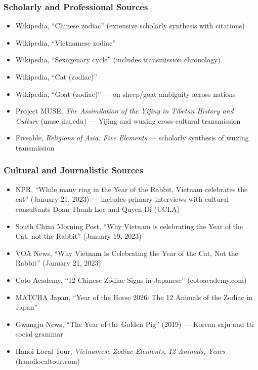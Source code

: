 \documentclass[11pt,letterpaper]{article}
\begin{document}
\subsubsection{Scholarly and Professional Sources}
\begin{itemize}[leftmargin=2em]
  \item Wikipedia, ``Chinese zodiac'' (extensive scholarly synthesis with citations)
  \item Wikipedia, ``Vietnamese zodiac''
  \item Wikipedia, ``Sexagenary cycle'' (includes transmission chronology)
  \item Wikipedia, ``Cat (zodiac)''
  \item Wikipedia, ``Goat (zodiac)'' --- on sheep/goat ambiguity across nations
  \item Project MUSE, \textit{The Assimilation of the Yijing in Tibetan History and Culture} (muse.jhu.edu) --- Yijing and wuxing cross-cultural transmission
  \item Fiveable, \textit{Religions of Asia: Five Elements} --- scholarly synthesis of wuxing transmission
\end{itemize}

\subsubsection{Cultural and Journalistic Sources}
\begin{itemize}[leftmargin=2em]
  \item NPR, ``While many ring in the Year of the Rabbit, Vietnam celebrates the cat'' (January 21, 2023) --- includes primary interviews with cultural consultants Doan Thanh Loc and Quyen Di (UCLA)
  \item South China Morning Post, ``Why Vietnam is celebrating the Year of the Cat, not the Rabbit'' (January 19, 2023)
  \item VOA News, ``Why Vietnam Is Celebrating the Year of the Cat, Not the Rabbit'' (January 21, 2023)
  \item Coto Academy, ``12 Chinese Zodiac Signs in Japanese'' (cotoacademy.com)
  \item MATCHA Japan, ``Year of the Horse 2026: The 12 Animals of the Zodiac in Japan''
  \item Gwangju News, ``The Year of the Golden Pig'' (2019) --- Korean saju and tti social grammar
  \item Hanoi Local Tour, \textit{Vietnamese Zodiac Elements, 12 Animals, Years} (hanoilocaltour.com)
\end{itemize}
\end{document}
